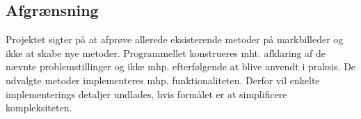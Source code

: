 \subsection{Afgrænsning} \label{subsec:afg}
Projektet sigter på at afprøve allerede eksisterende metoder på markbilleder og ikke at
skabe nye metoder. Programmellet konstrueres mht. afklaring af de nævnte problemstillinger
og ikke mhp. efterfølgende at blive anvendt i praksis. De udvalgte metoder implementeres mhp. funktionaliteten. Derfor vil enkelte implementerings detaljer undlades, hvis formålet er at simplificere kompleksiteten.